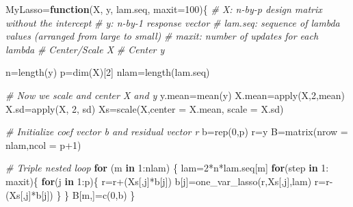 \documentclass[
]{article}
\newenvironment{Shaded}{\begin{snugshade}}{\end{snugshade}}
\newcommand{\AttributeTok}[1]{\textcolor[rgb]{0.77,0.63,0.00}{#1}}
\newcommand{\CommentTok}[1]{\textcolor[rgb]{0.56,0.35,0.01}{\textit{#1}}}
\newcommand{\ControlFlowTok}[1]{\textcolor[rgb]{0.13,0.29,0.53}{\textbf{#1}}}
\newcommand{\DecValTok}[1]{\textcolor[rgb]{0.00,0.00,0.81}{#1}}
\newcommand{\FunctionTok}[1]{\textcolor[rgb]{0.00,0.00,0.00}{#1}}
\newcommand{\NormalTok}[1]{#1}
\newcommand{\OtherTok}[1]{\textcolor[rgb]{0.56,0.35,0.01}{#1}}
\newcommand{\SpecialCharTok}[1]{\textcolor[rgb]{0.00,0.00,0.00}{#1}}
\begin{document}
\begin{Shaded}
\begin{Highlighting}[]
\NormalTok{MyLasso}\OtherTok{=}\ControlFlowTok{function}\NormalTok{(X, y, lam.seq, }\AttributeTok{maxit=}\DecValTok{100}\NormalTok{)\{}
  \CommentTok{\# X: n{-}by{-}p design matrix without the intercept}
  \CommentTok{\# y: n{-}by{-}1 response vector}
  \CommentTok{\# lam.seq: sequence of lambda values (arranged from large to small)}
  \CommentTok{\# maxit: number of updates for each lambda}
  \CommentTok{\# Center/Scale X}
  \CommentTok{\# Center y}
  
\NormalTok{  n}\OtherTok{=}\FunctionTok{length}\NormalTok{(y)}
\NormalTok{  p}\OtherTok{=}\FunctionTok{dim}\NormalTok{(X)[}\DecValTok{2}\NormalTok{]}
\NormalTok{  nlam}\OtherTok{=}\FunctionTok{length}\NormalTok{(lam.seq)}
  
  \CommentTok{\# Now we scale and center X and y}
\NormalTok{  y.mean}\OtherTok{=}\FunctionTok{mean}\NormalTok{(y)}
\NormalTok{  X.mean}\OtherTok{=}\FunctionTok{apply}\NormalTok{(X,}\DecValTok{2}\NormalTok{,mean)}
\NormalTok{  X.sd}\OtherTok{=}\FunctionTok{apply}\NormalTok{(X, }\DecValTok{2}\NormalTok{, sd)}
\NormalTok{  Xs}\OtherTok{=}\FunctionTok{scale}\NormalTok{(X,}\AttributeTok{center =}\NormalTok{ X.mean, }\AttributeTok{scale =}\NormalTok{ X.sd)}
  
  \CommentTok{\# Initialize coef vector b and residual vector r}
\NormalTok{  b}\OtherTok{=}\FunctionTok{rep}\NormalTok{(}\DecValTok{0}\NormalTok{,p)}
\NormalTok{  r}\OtherTok{=}\NormalTok{y}
\NormalTok{  B}\OtherTok{=}\FunctionTok{matrix}\NormalTok{(}\AttributeTok{nrow =}\NormalTok{ nlam,}\AttributeTok{ncol =}\NormalTok{ p}\SpecialCharTok{+}\DecValTok{1}\NormalTok{)}
  
  \CommentTok{\# Triple nested loop}
  \ControlFlowTok{for}\NormalTok{ (m }\ControlFlowTok{in} \DecValTok{1}\SpecialCharTok{:}\NormalTok{nlam) \{}
\NormalTok{    lam}\OtherTok{=}\DecValTok{2}\SpecialCharTok{*}\NormalTok{n}\SpecialCharTok{*}\NormalTok{lam.seq[m]}
    \ControlFlowTok{for}\NormalTok{(step }\ControlFlowTok{in} \DecValTok{1}\SpecialCharTok{:}\NormalTok{ maxit)\{}
      \ControlFlowTok{for}\NormalTok{(j }\ControlFlowTok{in} \DecValTok{1}\SpecialCharTok{:}\NormalTok{p)\{}
\NormalTok{        r}\OtherTok{=}\NormalTok{r}\SpecialCharTok{+}\NormalTok{(Xs[,j]}\SpecialCharTok{*}\NormalTok{b[j])}
\NormalTok{        b[j]}\OtherTok{=}\FunctionTok{one\_var\_lasso}\NormalTok{(r,Xs[,j],lam)}
\NormalTok{        r}\OtherTok{=}\NormalTok{r}\SpecialCharTok{{-}}\NormalTok{(Xs[,j]}\SpecialCharTok{*}\NormalTok{b[j])}
\NormalTok{      \}}
\NormalTok{    \}}
\NormalTok{    B[m,]}\OtherTok{=}\FunctionTok{c}\NormalTok{(}\DecValTok{0}\NormalTok{,b)}
\NormalTok{  \}}
  

\end{Highlighting}
\end{Shaded}
\end{document}
